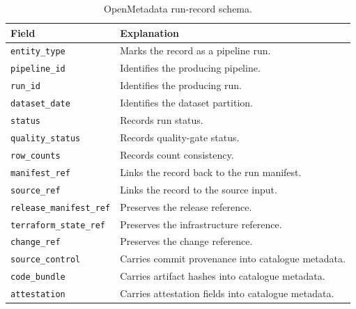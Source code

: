 \begin{table}[H]
  \centering
  \caption{OpenMetadata run-record schema.}
  \label{tab:schema-openmetadata-run}
  \renewcommand{\arraystretch}{1.12}
  \begin{tabularx}{\textwidth}{@{}p{}X@{}}
    \toprule
    \textbf{Field} & \textbf{Explanation} \\
    \midrule
    \texttt{entity\_type} & Marks the record as a pipeline run. \\
    \texttt{pipeline\_id} & Identifies the producing pipeline. \\
    \texttt{run\_id} & Identifies the producing run. \\
    \texttt{dataset\_date} & Identifies the dataset partition. \\
    \texttt{status} & Records run status. \\
    \texttt{quality\_status} & Records quality-gate status. \\
    \texttt{row\_counts} & Records count consistency. \\
    \texttt{manifest\_ref} & Links the record back to the run manifest. \\
    \texttt{source\_ref} & Links the record to the source input. \\
    \texttt{release\_manifest\_ref} & Preserves the release reference. \\
    \texttt{terraform\_state\_ref} & Preserves the infrastructure reference. \\
    \texttt{change\_ref} & Preserves the change reference. \\
    \texttt{source\_control} & Carries commit provenance into catalogue metadata. \\
    \texttt{code\_bundle} & Carries artifact hashes into catalogue metadata. \\
    \texttt{attestation} & Carries attestation fields into catalogue metadata. \\
    \bottomrule
  \end{tabularx}
\end{table}

